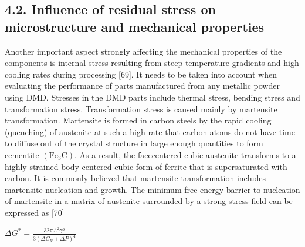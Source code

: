 \documentclass[10pt]{article}
\begin{document}
\subsection*{4.2. Influence of residual stress on microstructure and mechanical properties}
Another important aspect strongly affecting the mechanical properties of the components is internal stress resulting from steep temperature gradients and high cooling rates during processing [69]. It needs to be taken into account when evaluating the performance of parts manufactured from any metallic powder using DMD. Stresses in the DMD parts include thermal stress, bending stress and transformation stress. Transformation stress is caused mainly by martensite transformation. Martensite is formed in carbon steels by the rapid cooling (quenching) of austenite at such a high rate that carbon atoms do not have time to diffuse out of the crystal structure in large enough quantities to form cementite $\left(\mathrm{Fe}_{3} \mathrm{C}\right)$. As a result, the facecentered cubic austenite transforms to a highly strained body-centered cubic form of ferrite that is supersaturated with carbon. It is commonly believed that martensite transformation includes martensite nucleation and growth. The minimum free energy barrier to nucleation of martensite in a matrix of austenite surrounded by a strong stress field can be expressed as [70]

$\Delta G^{*}=\frac{32 \pi A^{2} \gamma^{3}}{3\left(\Delta G_{V}+\Delta P\right)^{4}}$
\end{document}
